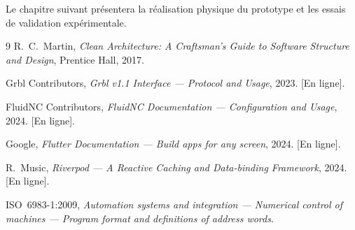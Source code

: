\documentclass[12pt,a4paper]{report}
\begin{document}
Le chapitre suivant présentera la réalisation physique du prototype et les essais de validation expérimentale.

\begin{thebibliography}{9}
R.~C.~Martin, \textit{Clean Architecture: A Craftsman's Guide to Software Structure and Design}, Prentice Hall, 2017.

Grbl Contributors, \textit{Grbl v1.1 Interface --- Protocol and Usage}, 2023. [En ligne].

FluidNC Contributors, \textit{FluidNC Documentation --- Configuration and Usage}, 2024. [En ligne].

Google, \textit{Flutter Documentation --- Build apps for any screen}, 2024. [En ligne].

R.~Music, \textit{Riverpod --- A Reactive Caching and Data-binding Framework}, 2024. [En ligne].

ISO~6983-1:2009, \textit{Automation systems and integration --- Numerical control of machines --- Program format and definitions of address words}.
\end{thebibliography}
\end{document}
